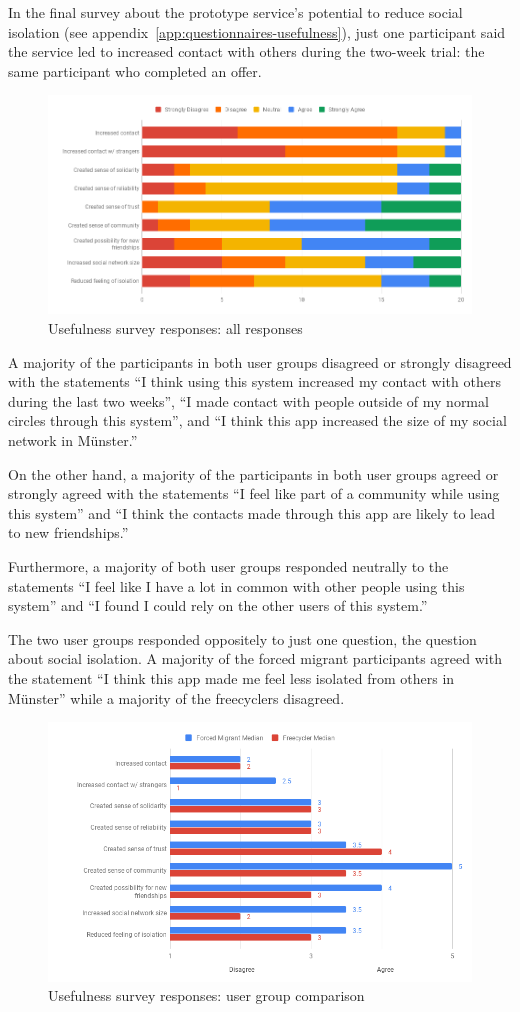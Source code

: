 In the final survey about the prototype service's potential to reduce social isolation (see appendix~\ref{app:questionnaires-usefulness}), just one participant said the service led to increased contact with others during the two-week trial: the same participant who completed an offer.

\begin{figure}[ht]
  \centering
  \includegraphics[scale=0.4]{images/usefulness_survey_results.png}
  \caption{Usefulness survey responses: all responses}
  \label{fig:usefulness_survey_results}
\end{figure}

A majority of the participants in both user groups disagreed or strongly disagreed with the statements ``I think using this system increased my contact with others during the last two weeks'', ``I made contact with people outside of my normal circles through this system'', and ``I think this app increased the size of my social network in Münster.''

On the other hand, a majority of the participants in both user groups agreed or strongly agreed with the statements ``I feel like part of a community while using this system'' and ``I think the contacts made through this app are likely to lead to new friendships.''

Furthermore, a majority of both user groups responded neutrally to the statements ``I feel like I have a lot in common with other people using this system'' and ``I found I could rely on the other users of this system.''

The two user groups responded oppositely to just one question, the question about social isolation. A majority of the forced migrant participants agreed with the statement ``I think this app made me feel less isolated from others in Münster'' while a majority of the freecyclers disagreed.

\begin{figure}[ht]
  \centering
  \includegraphics[scale=0.5]{images/usefulness_survey_medians.png}
  \caption{Usefulness survey responses: user group comparison}
  \label{fig:usefulness_survey_medians}
\end{figure}
